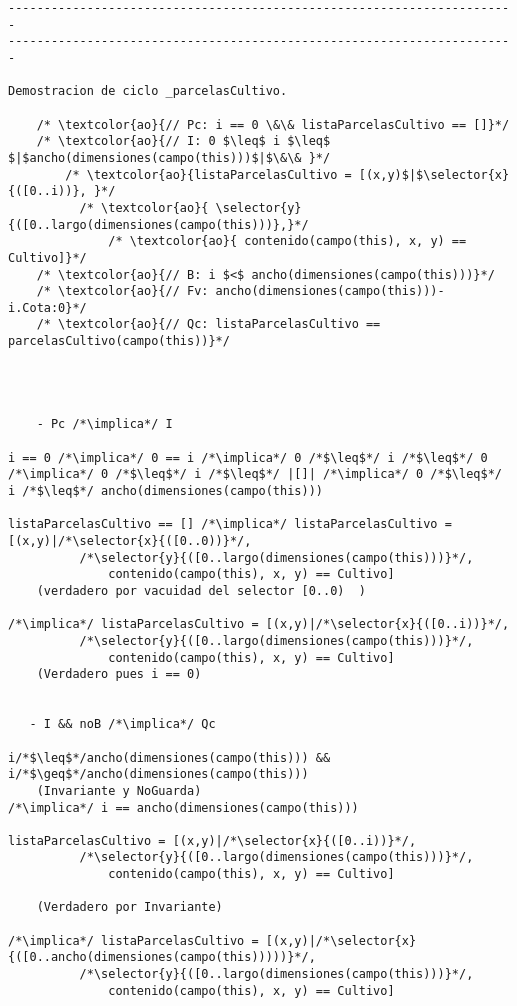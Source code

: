 \begin{lstlisting}
-----------------------------------------------------------------------
-----------------------------------------------------------------------

Demostracion de ciclo _parcelasCultivo.

    /* \textcolor{ao}{// Pc: i == 0 \&\& listaParcelasCultivo == []}*/        
  	/* \textcolor{ao}{// I: 0 $\leq$ i $\leq$ $|$ancho(dimensiones(campo(this)))$|$\&\& }*/
    	/* \textcolor{ao}{listaParcelasCultivo = [(x,y)$|$\selector{x}{([0..i))}, }*/		
  		  /* \textcolor{ao}{ \selector{y}{([0..largo(dimensiones(campo(this)))},}*/		
    		  /* \textcolor{ao}{ contenido(campo(this), x, y) == Cultivo]}*/
    /* \textcolor{ao}{// B: i $<$ ancho(dimensiones(campo(this)))}*/
    /* \textcolor{ao}{// Fv: ancho(dimensiones(campo(this)))-i.Cota:0}*/
    /* \textcolor{ao}{// Qc: listaParcelasCultivo == parcelasCultivo(campo(this))}*/    




    - Pc /*\implica*/ I
    
i == 0 /*\implica*/ 0 == i /*\implica*/ 0 /*$\leq$*/ i /*$\leq$*/ 0
/*\implica*/ 0 /*$\leq$*/ i /*$\leq$*/ |[]| /*\implica*/ 0 /*$\leq$*/ i /*$\leq$*/ ancho(dimensiones(campo(this)))

listaParcelasCultivo == [] /*\implica*/ listaParcelasCultivo = [(x,y)|/*\selector{x}{([0..0))}*/,	
  		  /*\selector{y}{([0..largo(dimensiones(campo(this)))}*/,
    		  contenido(campo(this), x, y) == Cultivo]
    (verdadero por vacuidad del selector [0..0)  )
    
/*\implica*/ listaParcelasCultivo = [(x,y)|/*\selector{x}{([0..i))}*/,	
  		  /*\selector{y}{([0..largo(dimensiones(campo(this)))}*/,
    		  contenido(campo(this), x, y) == Cultivo]
    (Verdadero pues i == 0)
    

   - I && noB /*\implica*/ Qc
   
i/*$\leq$*/ancho(dimensiones(campo(this))) &&  i/*$\geq$*/ancho(dimensiones(campo(this)))
	(Invariante y NoGuarda)
/*\implica*/ i == ancho(dimensiones(campo(this)))

listaParcelasCultivo = [(x,y)|/*\selector{x}{([0..i))}*/,	
  		  /*\selector{y}{([0..largo(dimensiones(campo(this)))}*/,
    		  contenido(campo(this), x, y) == Cultivo]
    
    (Verdadero por Invariante)
    
/*\implica*/ listaParcelasCultivo = [(x,y)|/*\selector{x}{([0..ancho(dimensiones(campo(this)))))}*/,	
  		  /*\selector{y}{([0..largo(dimensiones(campo(this)))}*/,
    		  contenido(campo(this), x, y) == Cultivo]
	

\end{lstlisting}
